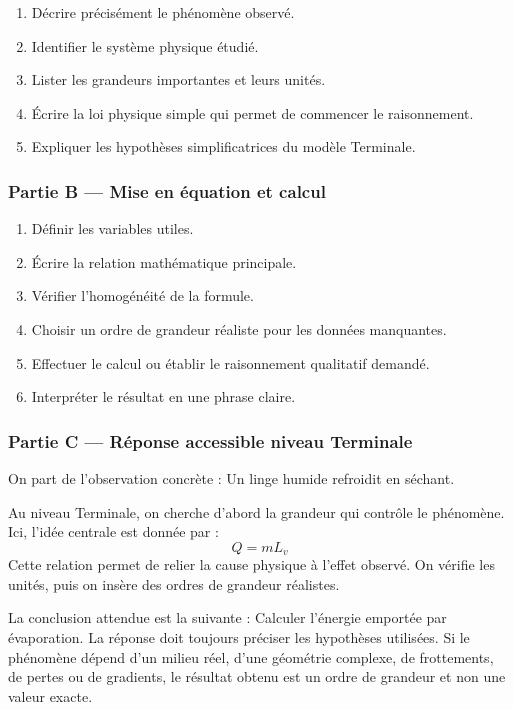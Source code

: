 \documentclass[11pt,a4paper]{article}
\begin{document}
\begin{enumerate}
  \item Décrire précisément le phénomène observé.
  \item Identifier le système physique étudié.
  \item Lister les grandeurs importantes et leurs unités.
  \item Écrire la loi physique simple qui permet de commencer le raisonnement.
  \item Expliquer les hypothèses simplificatrices du modèle Terminale.
\end{enumerate}

\subsubsection*{Partie B — Mise en équation et calcul}

\begin{enumerate}
  \item Définir les variables utiles.
  \item Écrire la relation mathématique principale.
  \item Vérifier l'homogénéité de la formule.
  \item Choisir un ordre de grandeur réaliste pour les données manquantes.
  \item Effectuer le calcul ou établir le raisonnement qualitatif demandé.
  \item Interpréter le résultat en une phrase claire.
\end{enumerate}

\subsubsection*{Partie C — Réponse accessible niveau Terminale}

\begin{corrigebox}
On part de l'observation concrète : Un linge humide refroidit en séchant.

Au niveau Terminale, on cherche d'abord la grandeur qui contrôle le phénomène. Ici, l'idée centrale est donnée par :
\[
Q=mL_v
\]
Cette relation permet de relier la cause physique à l'effet observé. On vérifie les unités, puis on insère des ordres de grandeur réalistes.

La conclusion attendue est la suivante : Calculer l'énergie emportée par évaporation. La réponse doit toujours préciser les hypothèses utilisées. Si le phénomène dépend d'un milieu réel, d'une géométrie complexe, de frottements, de pertes ou de gradients, le résultat obtenu est un ordre de grandeur et non une valeur exacte.
\end{corrigebox}
\end{document}
